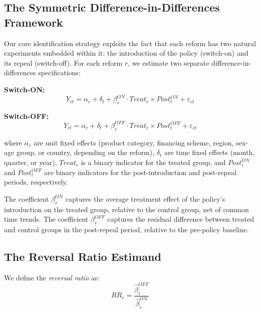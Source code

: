 \documentclass[12pt]{article}
\begin{document}
\subsection{The Symmetric Difference-in-Differences Framework}

Our core identification strategy exploits the fact that each reform has two natural experiments embedded within it: the introduction of the policy (switch-on) and its repeal (switch-off). For each reform $r$, we estimate two separate difference-in-differences specifications:

\textbf{Switch-ON:}
\begin{equation}
Y_{ct} = \alpha_c + \delta_t + \beta^{ON}_r \cdot Treat_c \times Post^{ON}_t + \varepsilon_{ct}
\label{eq:switch_on}
\end{equation}

\textbf{Switch-OFF:}
\begin{equation}
Y_{ct} = \alpha_c + \delta_t + \beta^{OFF}_r \cdot Treat_c \times Post^{OFF}_t + \varepsilon_{ct}
\label{eq:switch_off}
\end{equation}

\noindent where $\alpha_c$ are unit fixed effects (product category, financing scheme, region, sex-age group, or country, depending on the reform), $\delta_t$ are time fixed effects (month, quarter, or year), $Treat_c$ is a binary indicator for the treated group, and $Post^{ON}_t$ and $Post^{OFF}_t$ are binary indicators for the post-introduction and post-repeal periods, respectively.

The coefficient $\beta^{ON}_r$ captures the average treatment effect of the policy's introduction on the treated group, relative to the control group, net of common time trends. The coefficient $\beta^{OFF}_r$ captures the residual difference between treated and control groups in the post-repeal period, relative to the pre-policy baseline.

\subsection{The Reversal Ratio Estimand}

We define the \textit{reversal ratio} as:
\begin{equation}
RR_r = \frac{\hat{\beta}^{OFF}_r}{\hat{\beta}^{ON}_r}
\label{eq:rr}
\end{equation}
\end{document}
